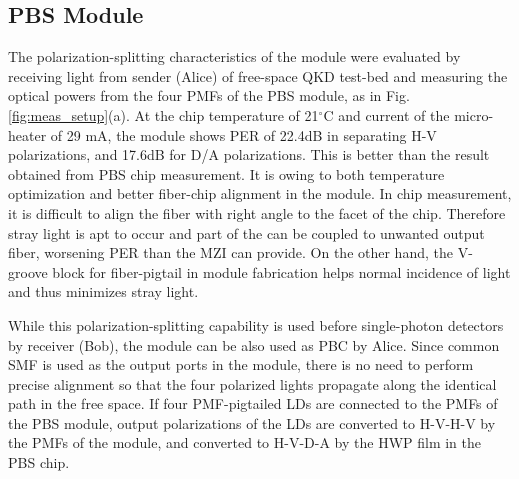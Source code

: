\documentclass[letterpaper, 10pt]{article}
\begin{document}
\subsection{PBS Module}
The polarization-splitting characteristics of the module were evaluated by receiving light from sender (Alice) of free-space QKD test-bed and measuring the optical powers from the four PMFs of the PBS module, as in Fig. \ref{fig:meas_setup}(a).
At the chip temperature of 21$^\circ$C and current of the micro-heater of 29 mA, the module shows PER of 22.4dB in separating H-V polarizations, and 17.6dB for D/A polarizations.
This is better than the result obtained from PBS chip measurement.
It is owing to both temperature optimization and better fiber-chip alignment in the module.
In chip measurement, it is difficult to align the fiber with right angle to the facet of the chip.
Therefore stray light is apt to occur and part of the can be coupled to unwanted output fiber, worsening PER than the MZI can provide.
On the other hand, the V-groove block for fiber-pigtail in module fabrication helps normal incidence of light and thus minimizes stray light.

While this polarization-splitting capability is used before single-photon detectors by receiver (Bob), the module can be also used as PBC by Alice.
Since common SMF is used as the output ports in the module, there is no need to perform precise alignment so that the four polarized lights propagate along the identical path in the free space.
If four PMF-pigtailed LDs are connected to the PMFs of the PBS module, output polarizations of the LDs are converted to H-V-H-V  by the PMFs of the module, and converted to  H-V-D-A  by the HWP film in the PBS chip.
\end{document}
